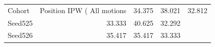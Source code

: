 \begin{tabular}{lrrr}
\toprule
Cohort & Position IPW (%
\midrule
All motions & 34.375 & 38.021 & 32.812\\
Seed525 & 33.333 & 40.625 & 32.292\\
Seed526 & 35.417 & 35.417 & 33.333\\
\bottomrule
\end{tabular}
